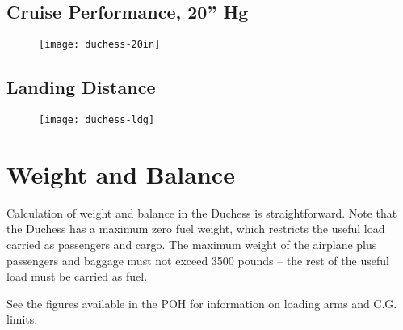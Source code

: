 {\section{Cruise Performance, 20” Hg}

\begin{figure}[H]
\begin{center}
\texttt{[image: duchess-20in]}
\end{center}
\end{figure}

\newpage

\section{Landing Distance}

\begin{figure}[H]
\begin{center}
\texttt{[image: duchess-ldg]}
\end{center}
\end{figure}

\chapter{Weight and Balance}

Calculation of weight and balance in the Duchess is straightforward.
Note that the Duchess has a maximum zero
fuel weight, which restricts the useful load carried as passengers
and cargo. The maximum weight of the airplane
plus passengers and baggage must not exceed 3500 pounds – the rest
of the useful load must be carried as fuel.

See the figures available in the POH for information on loading arms and C.G. limits.

\begingroup
\renewcommand{\arraystretch}{1.1} %

}
